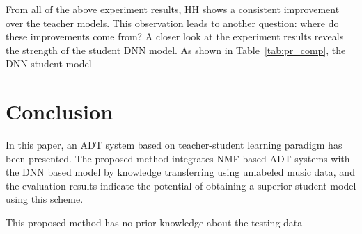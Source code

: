 \documentclass{article}
\begin{document}
From all of the above experiment results, HH shows a consistent improvement over the teacher models. This observation leads to another question: where do these improvements come from? A closer look at the experiment results reveals the strength of the student DNN model. As shown in Table~\ref{tab:pr_comp}, the DNN student model 
 
 






\section{Conclusion}\label{sec:conclusion}
In this paper, an ADT system based on teacher-student learning paradigm has been presented. The proposed method integrates NMF based ADT systems with the DNN based model by knowledge transferring using unlabeled music data, and the evaluation results indicate the potential of obtaining a superior student model using this scheme.  

This proposed method has no prior knowledge about the testing data








\end{document}
